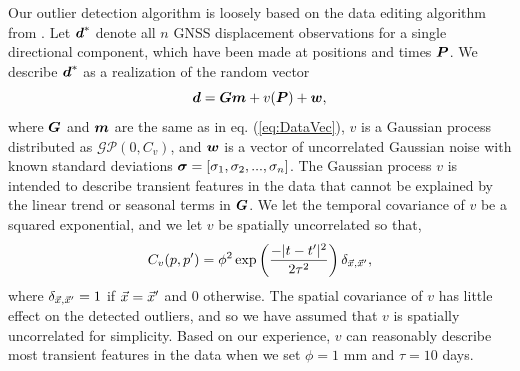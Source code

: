 \documentclass[extra,mreferee]{gji}
\begin{document}
Our outlier detection algorithm is loosely based on the data editing
algorithm from \citet{Acheson1975}. Let $\data^*$ denote all $n$ GNSS
displacement observations for a single directional component, which
have been made at positions and times $\points$.  We describe
$\data^*$ as a realization of the random vector
\begin{equation}\label{eq:OutlierDataVec}
\data = \G\mitbf{m} + v(\points) + \mitbf{w},
\end{equation}
where $\G$ and $\mitbf{m}$ are the same as in eq. (\ref{eq:DataVec}),
$v$ is a Gaussian process distributed as $\mathcal{GP}(0,C_v)$, and
$\mitbf{w}$ is a vector of uncorrelated Gaussian noise with known
standard deviations $\mitbf{\sigma} = [\sigma_1, \sigma_2, ...,
\sigma_n]$. The Gaussian process $v$ is intended to describe transient
features in the data that cannot be explained by the linear trend or
seasonal terms in $\G$. We let the temporal covariance of $v$ be a
squared exponential, and we let $v$ be spatially uncorrelated so that,
\begin{equation}
C_v(p,p') = \phi^2\exp\left(\frac{-|t - t'|^2}{2\tau^2}\right) \delta_{\vec{x},\vec{x}'},
\end{equation}
where $\delta_{\vec{x},\vec{x}'} = 1$ if $\vec{x} = \vec{x}'$ and $0$ otherwise.
The spatial covariance of $v$ has little effect on the detected
outliers, and so we have assumed that $v$ is spatially uncorrelated
for simplicity. Based on our experience, $v$ can reasonably describe
most transient features in the data when we set $\phi = 1$ mm and
$\tau = 10$ days.
\end{document}
